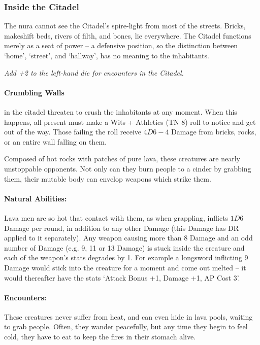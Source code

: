 \begin{multicols}{2}
\subsubsection{Inside the Citadel}

The nura cannot see the Citadel's spire-light from most of the streets.
Bricks, makeshift beds, rivers of filth, and bones, lie everywhere.
The Citadel functions merely as a seat of power -- a defensive position, so the distinction between `home', `street', and `hallway', has no meaning to the inhabitants.

\textit{Add +2 to the left-hand die for encounters in the Citadel.}


\paragraph{Crumbling Walls}
in the citadel threaten to crush the inhabitants at any moment.
When this happens, all present must make a Wits + Athletics (TN 8) roll to notice and get out of the way.
Those failing the roll receive $4D6-4$ Damage from bricks, rocks, or an entire wall falling on them.

\label{lavaman}

Composed of hot rocks with patches of pure lava, these creatures are nearly unstoppable opponents.
Not only can they burn people to a cinder by grabbing them, their mutable body can envelop weapons which strike them.

\paragraph{Natural Abilities:} Lava men are so hot that contact with them, as when grappling, inflicts $1D6$ Damage per round, in addition to any other Damage (this Damage has DR applied to it separately).
Any weapon causing more than 8 Damage and an odd number of Damage (e.g. 9, 11 or 13 Damage) is stuck inside the creature and each of the weapon's stats degrades by 1.
For example a longsword inflicting 9 Damage would stick into the creature for a moment and come out melted -- it would thereafter have the stats `Attack Bonus +1, Damage +1, AP Cost 3'.

\paragraph{Encounters:} These creatures never suffer from heat, and can even hide in lava pools, waiting to grab people.
Often, they wander peacefully, but any time they begin to feel cold, they have to eat to keep the fires in their stomach alive.

\end{multicols}

